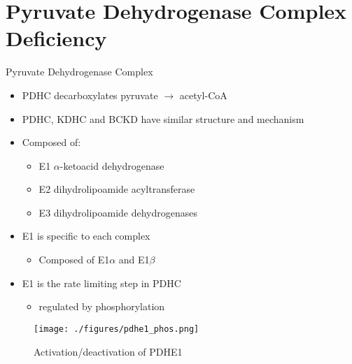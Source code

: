 \documentclass[presentation, smaller]{beamer}
\begin{document}
\section{Pyruvate Dehydrogenase Complex Deficiency}
\label{sec:org96df316}
\begin{frame}[label={sec:orgd2fae0a}]{Pyruvate Dehydrogenase Complex}
\begin{itemize}
\item PDHC decarboxylates pyruvate \(\to\) acetyl-CoA

\item PDHC, KDHC and BCKD have similar structure and mechanism
\item Composed of:
\begin{itemize}
\item E1 \(\alpha\)-ketoacid dehydrogenase
\item E2 dihydrolipoamide acyltransferase
\item E3 dihydrolipoamide dehydrogenases
\end{itemize}
\item E1 is specific to each complex
\begin{itemize}
\item Composed of E1\(\alpha\) and E1\(\beta\)
\end{itemize}
\item E1 is the rate limiting step in PDHC
\begin{itemize}
\item regulated by phosphorylation
\end{itemize}
\end{itemize}

\begin{figure}[htbp]
\centering
\texttt{[image: ./figures/pdhe1\_phos.png]}
\caption[pdhe1]{\label{fig:org328f91d}
Activation/deactivation of PDHE1}
\end{figure}
\end{frame}
\end{document}
